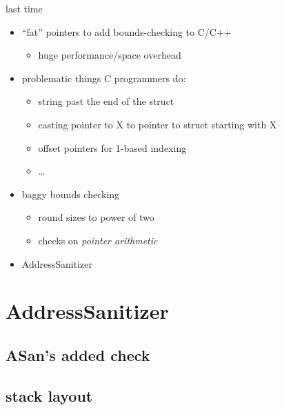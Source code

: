 \graphicspath{{./figures/}}
\title{}
\date{}

\begin{frame}
    \titlepage
\end{frame}

\begin{frame}{last time}
    \begin{itemize}
    \item ``fat'' pointers to add bounds-checking to C/C++
        \begin{itemize}
        \item huge performance/space overhead
        \end{itemize}
    \item problematic things C programmers do:
        \begin{itemize}
        \item string past the end of the struct
        \item casting pointer to X to pointer to struct starting with X
        \item offset pointers for 1-based indexing
        \item \ldots
        \end{itemize}
    \item baggy bounds checking
        \begin{itemize}
        \item round sizes to power of two
        \item checks on \textit{pointer arithmetic}
        \end{itemize}
    \item AddressSanitizer
    \end{itemize}
\end{frame}

\section{AddressSanitizer}


\subsection{ASan's added check}


\subsection{stack layout}


